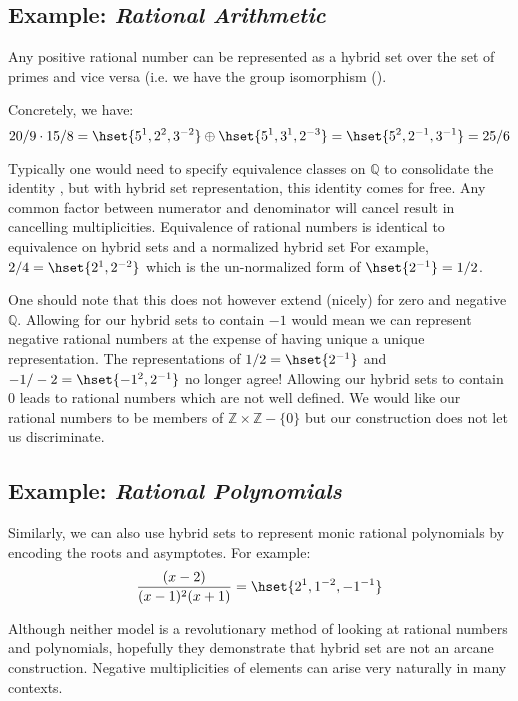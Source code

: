 \subsection{Example: \emph{Rational Arithmetic}}


Any positive rational number can be represented as a hybrid set over the set of primes and vice versa  
(i.e. we have the group isomorphism ().


\begin{example}
	Concretely, we have:
	\begin{equation*}
		20/9 \cdot 15/8 
			= \hset{5^1, 2^2, 3^{-2}} \oplus \hset{5^1, 3^1, 2^{-3}} 
			= \hset{5^2, 2^{-1}, 3^{-1}} 
			= 25/6
	\end{equation*}
\end{example}


Typically one would need to specify equivalence classes on $\mathbb{Q}$ to consolidate the identity ,
but with hybrid set representation, this identity comes for free.
Any common factor between numerator and denominator will cancel result in cancelling multiplicities. 
Equivalence of rational numbers is identical to equivalence on hybrid sets and a normalized hybrid set
For example, $2/4 = \hset{2^1, 2^{-2}}$ which is the un-normalized form of $\hset{2^{-1}} = 1/2$.


One should note that this does not however extend (nicely) for zero and negative $\mathbb{Q}$.
Allowing for our hybrid sets to contain $-1$ would mean we can represent negative rational numbers at the expense of having unique a unique representation. 
The representations of $1/2 = \hset{ 2^{-1}}$ and $-1/-2 = \hset{-1^2, 2^{-1}}$ no longer agree!
Allowing our hybrid sets to contain $0$ leads to rational numbers which are not well defined.
We would like our rational numbers to be members of $\mathbb{Z} \times \mathbb{Z} - \{ 0 \}$ but our construction does not let us discriminate.



\subsection{Example: \emph{Rational Polynomials}}


Similarly, we can also use hybrid sets to represent monic rational polynomials by encoding the roots and asymptotes.
For example:
\begin{equation}
	\frac{(x-2)}{(x-1)^2(x+1)} = \hset{ 2^1, 1^{-2}, -1^{-1} }
\end{equation}


Although neither model is a revolutionary method of looking at rational numbers and polynomials,
hopefully they demonstrate that hybrid set are not an arcane construction. 
Negative multiplicities of elements can arise very naturally in many contexts.